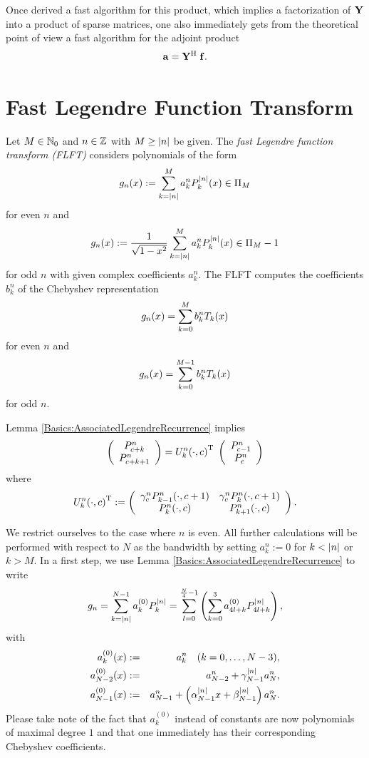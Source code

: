 Once derived a fast algorithm for this product, which implies a factorization of $\mathbf{Y}$ into a product of sparse matrices,
one also immediately gets from the theoretical point of view a fast algorithm for the adjoint product 
$$\mathbf{a} = \mathbf{Y}^{\text{\rm{H}}} \; \mathbf{f}.$$

\section{Fast Legendre Function Transform}
\label{DSFT:FLFT}

Let $M \in \mathbb{N}_{0}$ and $n \in \mathbb{Z}$ with $M \ge \left\vert n\right\vert$ be given. The  \emph{fast Legendre function transform (FLFT)}
considers polynomials of the form
$$ g_n{\hspace{-0.4ex}}\left(x\right) := \sum_{k=\left\vert n\right\vert}^M a_k^n P_k^{\left\vert n\right\vert}{\hspace{-0.4ex}}\left(x\right) \in \Pi_M$$
for even $n$ and
$$ g_n{\hspace{-0.4ex}}\left(x\right) := \frac{1}{\sqrt{1-x^2}} \sum_{k=\left\vert n\right\vert}^M a_k^n P_k^{\left\vert n\right\vert}{\hspace{-0.4ex}}\left(x\right) \in \Pi_M-1$$
for odd $n$ with given complex coefficients $a_k^n$. The FLFT computes the coefficients $b_k^n$ of the Chebyshev representation
$$ g_n{\hspace{-0.4ex}}\left(x\right) = \sum_{k=0}^M b_k^n T_k{\hspace{-0.4ex}}\left(x\right)$$
for even $n$ and
$$g_n{\hspace{-0.4ex}}\left(x\right) = \sum_{k=0}^{M-1} b_k^n T_k{\hspace{-0.4ex}}\left(x\right)$$
for odd $n$.

Lemma \ref{Basics:AssociatedLegendreRecurrence} implies
$$ 
  \left(\begin{array}{c}
    P_{c+k}^n \\ P_{c+k+1}^n
  \end{array}\right)
  =
  U_{k}^{n}{\hspace{-0.4ex}}\left(\cdot,c\right)^{\text{\rm{T}}}\;
  \left(\begin{array}{c}
    P_{c-1}^n \\ P_{c}^n
  \end{array}\right)
$$
where
$$
  U_{k}^{n}{\hspace{-0.4ex}}\left(\cdot,c\right)^{\text{\rm{T}}} :=
  \left(\begin{array}{cc}
    \gamma_c^n P_{k-1}^n{\hspace{-0.4ex}}\left(\cdot,c+1\right) & \gamma_c^n P_{k}^n{\hspace{-0.4ex}}\left(\cdot,c+1\right) \\
                             P_{k}^n{\hspace{-0.4ex}}\left(\cdot,c\right)         &                         P_{k+1}^n{\hspace{-0.4ex}}\left(\cdot,c\right)
  \end{array}\right).   
$$

We restrict ourselves to the case where $n$ is even. All further calculations will be performed with respect to $N$ as the 
bandwidth by setting $a_k^n := 0$ for $k < \left\vert n\right\vert$ or $k > M$. In a first step, we use Lemma 
\ref{Basics:AssociatedLegendreRecurrence} to write
$$ g_n = \sum_{k = \left\vert n\right\vert}^{N-1} a_{k}^{(0)} P_k^{\left\vert n\right\vert} = \sum_{l = 0}^{\frac{N}{4}-1} \left(\sum_{k = 0}^3 a_{4l+k}^{(0)}P_{4l+k}^{\left\vert n\right\vert}\right),$$
with
\begin{eqnarray*}
  a_k^{(0)}{\hspace{-0.4ex}}\left(x\right)     & := & a_k^n \quad (k = 0,\ldots,N-3),\\
  a_{N-2}^{(0)}{\hspace{-0.4ex}}\left(x\right) & := & a_{N-2}^n + \gamma_{N-1}^{\left\vert n\right\vert} a_N^n,\\
  a_{N-1}^{(0)}{\hspace{-0.4ex}}\left(x\right) & := & a_{N-1}^n + \left(\alpha_{N-1}^{\left\vert n\right\vert}x + \beta_{N-1}^{\left\vert n\right\vert}\right) a_N^n.
\end{eqnarray*}
Please take note of the fact that $a_k^{(0)}$  instead of constants are now polynomials of 
maximal degree $1$ and that one immediately has their corresponding Chebyshev coefficients.

